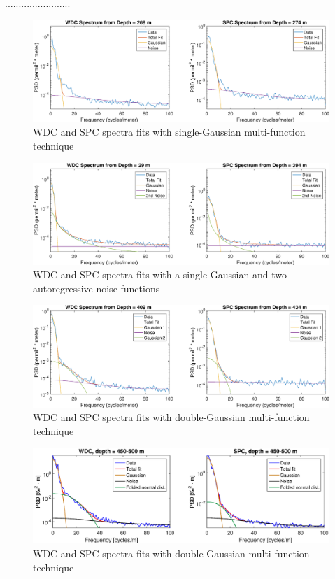 \documentclass[draft, jgrga]{AGUTeX}
\begin{document}
........................

\begin{figure}
\includegraphics[width=.9\linewidth]{1_gauss.eps}
\caption{WDC and SPC spectra fits with single-Gaussian multi-function technique}\label{1_gauss}
\end{figure}

\begin{figure}
\includegraphics[width=.9\linewidth]{GRR_fit.eps}
\caption{WDC and SPC spectra fits with a single Gaussian and two autoregressive noise functions}\label{GRR_fit}
\end{figure}

\begin{figure}
\includegraphics[width=.9\linewidth]{2_gauss.eps}
\caption{WDC and SPC spectra fits with double-Gaussian multi-function technique}\label{2_gauss}
\end{figure}

\begin{figure}
	\includegraphics[width=1.1\linewidth]{folded_normal_gauss_spectrum.eps}
	\caption{WDC and SPC spectra fits with double-Gaussian multi-function technique}\label{folded_normal_gauss_spectrum}
\end{figure}
\end{document}
